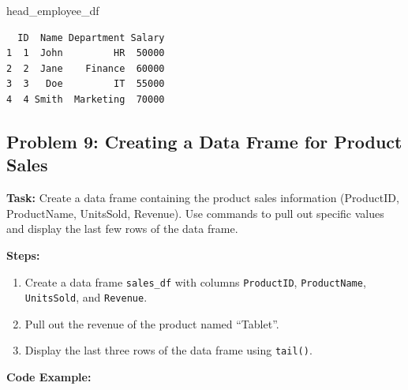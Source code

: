 \documentclass[
  letterpaper,
  DIV=11,
  numbers=noendperiod]{scrreprt}
\newenvironment{Shaded}{\begin{snugshade}}{\end{snugshade}}
\newcommand{\NormalTok}[1]{\textcolor[rgb]{0.00,0.23,0.31}{#1}}
\providecommand{\tightlist}{%
  \setlength{\itemsep}{0pt}\setlength{\parskip}{0pt}}\usepackage{longtable,booktabs,array}
\begin{document}
\begin{Shaded}
\begin{Highlighting}[]
\NormalTok{head\_employee\_df}
\end{Highlighting}
\end{Shaded}

\begin{verbatim}
  ID  Name Department Salary
1  1  John         HR  50000
2  2  Jane    Finance  60000
3  3   Doe         IT  55000
4  4 Smith  Marketing  70000
\end{verbatim}

\subsection*{Problem 9: Creating a Data Frame for Product
Sales}\label{problem-9-creating-a-data-frame-for-product-sales}

\textbf{Task:} Create a data frame containing the product sales
information (ProductID, ProductName, UnitsSold, Revenue). Use commands
to pull out specific values and display the last few rows of the data
frame.

\textbf{Steps:}

\begin{enumerate}
\def\labelenumi{\arabic{enumi}.}
\tightlist
\item
  Create a data frame \texttt{sales\_df} with columns
  \texttt{ProductID}, \texttt{ProductName}, \texttt{UnitsSold}, and
  \texttt{Revenue}.
\item
  Pull out the revenue of the product named ``Tablet''.
\item
  Display the last three rows of the data frame using \texttt{tail()}.
\end{enumerate}

\textbf{Code Example:}
\end{document}
